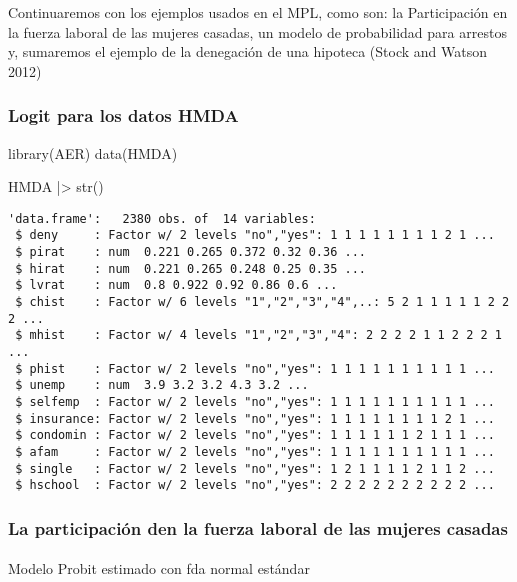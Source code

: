 \documentclass[
  letterpaper,
  DIV=11,
  numbers=noendperiod]{scrreprt}
\makeatletter
\let\oldparagraph\paragraph
\renewcommand{\paragraph}{
    \@ifstar
      \xxxParagraphStar
      \xxxParagraphNoStar
  }
\newcommand{\xxxParagraphStar}[1]{\oldparagraph*{#1}\mbox{}}
\newcommand{\xxxParagraphNoStar}[1]{\oldparagraph{#1}\mbox{}}
\newenvironment{Shaded}{\begin{snugshade}}{\end{snugshade}}
\newcommand{\FunctionTok}[1]{\textcolor[rgb]{0.28,0.35,0.67}{#1}}
\newcommand{\NormalTok}[1]{\textcolor[rgb]{0.00,0.23,0.31}{#1}}
\newcommand{\SpecialCharTok}[1]{\textcolor[rgb]{0.37,0.37,0.37}{#1}}
\makeatother
\begin{document}
Continuaremos con los ejemplos usados en el MPL, como son: la
Participación en la fuerza laboral de las mujeres casadas, un modelo de
probabilidad para arrestos y, sumaremos el ejemplo de la denegación de
una hipoteca (Stock and Watson 2012)

\subsubsection{Logit para los datos
HMDA}\label{logit-para-los-datos-hmda}

\begin{Shaded}
\begin{Highlighting}[]
\FunctionTok{library}\NormalTok{(AER)}
\FunctionTok{data}\NormalTok{(HMDA)}

\NormalTok{HMDA }\SpecialCharTok{|\textgreater{}}
  \FunctionTok{str}\NormalTok{()}
\end{Highlighting}
\end{Shaded}

\begin{verbatim}
'data.frame':   2380 obs. of  14 variables:
 $ deny     : Factor w/ 2 levels "no","yes": 1 1 1 1 1 1 1 1 2 1 ...
 $ pirat    : num  0.221 0.265 0.372 0.32 0.36 ...
 $ hirat    : num  0.221 0.265 0.248 0.25 0.35 ...
 $ lvrat    : num  0.8 0.922 0.92 0.86 0.6 ...
 $ chist    : Factor w/ 6 levels "1","2","3","4",..: 5 2 1 1 1 1 1 2 2 2 ...
 $ mhist    : Factor w/ 4 levels "1","2","3","4": 2 2 2 2 1 1 2 2 2 1 ...
 $ phist    : Factor w/ 2 levels "no","yes": 1 1 1 1 1 1 1 1 1 1 ...
 $ unemp    : num  3.9 3.2 3.2 4.3 3.2 ...
 $ selfemp  : Factor w/ 2 levels "no","yes": 1 1 1 1 1 1 1 1 1 1 ...
 $ insurance: Factor w/ 2 levels "no","yes": 1 1 1 1 1 1 1 1 2 1 ...
 $ condomin : Factor w/ 2 levels "no","yes": 1 1 1 1 1 1 2 1 1 1 ...
 $ afam     : Factor w/ 2 levels "no","yes": 1 1 1 1 1 1 1 1 1 1 ...
 $ single   : Factor w/ 2 levels "no","yes": 1 2 1 1 1 1 2 1 1 2 ...
 $ hschool  : Factor w/ 2 levels "no","yes": 2 2 2 2 2 2 2 2 2 2 ...
\end{verbatim}

\subsubsection{La participación den la fuerza laboral de las mujeres
casadas}\label{la-participaciuxf3n-den-la-fuerza-laboral-de-las-mujeres-casadas}

\paragraph{Modelo Probit estimado con fda normal
estándar}\label{modelo-probit-estimado-con-fda-normal-estuxe1ndar}
\end{document}
